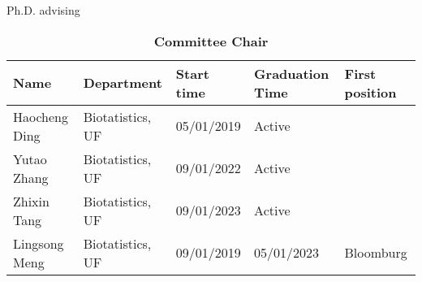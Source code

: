\documentclass{resume} %
\begin{document}
\begin{rSection}{Ph.D. advising}

\begin{table}[htp]
\caption*{\textbf{Committee Chair}}
\begin{center}
\begin{tabular}{l l l l l}
\hline
\hline
Name & Department & Start time & Graduation Time & First position \\
\hline
Haocheng Ding & Biotatistics, UF & 05/01/2019 &  Active &  \\
Yutao Zhang & Biotatistics, UF & 09/01/2022 & Active &  \\
Zhixin Tang & Biotatistics, UF & 09/01/2023 & Active &  \\
Lingsong Meng & Biotatistics, UF & 09/01/2019 & 05/01/2023 &  Bloomburg \\ 
\hline
\hline
\end{tabular}
\end{center}
\label{default}
\end{table}%



\end{rSection}
\end{document}
